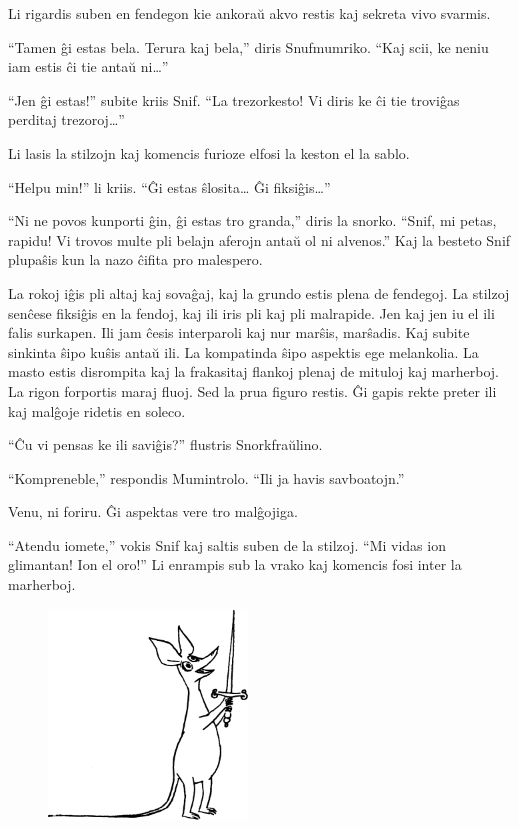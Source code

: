 Li rigardis suben en fendegon kie ankoraŭ akvo restis kaj sekreta vivo svarmis.

``Tamen ĝi estas bela. Terura kaj bela,'' diris Snufmumriko. ``Kaj scii, ke neniu iam estis ĉi tie antaŭ ni{\ldots}''

``Jen ĝi estas!'' subite kriis Snif. ``La trezorkesto! Vi diris ke ĉi tie troviĝas perditaj trezoroj{\ldots}''

Li lasis la stilzojn kaj komencis furioze elfosi la keston el la sablo.

``Helpu min!'' li kriis. ``Ĝi estas ŝlosita{\ldots} Ĝi fiksiĝis{\ldots}''

``Ni ne povos kunporti ĝin, ĝi estas tro granda,'' diris la snorko. ``Snif, mi petas, rapidu! Vi trovos multe pli belajn aferojn antaŭ ol ni alvenos.'' Kaj la besteto Snif plupaŝis kun la nazo ĉifita pro malespero.

La rokoj iĝis pli altaj kaj sovaĝaj, kaj la grundo estis plena de fendegoj. La stilzoj senĉese fiksiĝis en la fendoj, kaj ili iris pli kaj pli malrapide. Jen kaj jen iu el ili falis surkapen. Ili jam ĉesis interparoli kaj nur marŝis, marŝadis. Kaj subite sinkinta ŝipo kuŝis antaŭ ili. La kompatinda ŝipo aspektis ege melankolia. La masto estis disrompita kaj la frakasitaj flankoj plenaj de mituloj kaj marherboj. La rigon forportis maraj fluoj. Sed la prua figuro restis. Ĝi gapis rekte preter ili kaj malĝoje ridetis en soleco.

``Ĉu vi pensas ke ili saviĝis?'' flustris Snorkfraŭlino.

``Kompreneble,'' respondis Mumintrolo. ``Ili ja havis savboatojn.''

Venu, ni foriru. Ĝi aspektas vere tro malĝojiga.

``Atendu iomete,'' vokis Snif kaj saltis suben de la stilzoj. ``Mi vidas ion glimantan! Ion el oro!'' Li enrampis sub la vrako kaj komencis fosi inter la marherboj.

\begin{figure}[htbp]
\centering
\includegraphics[width=150pt,height=159pt]{7-5.png}
\caption{}
\label{7-5}
\end{figure}

